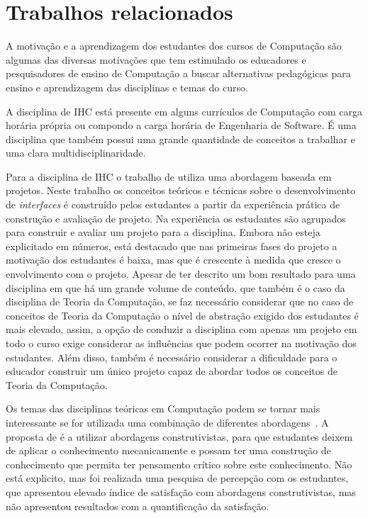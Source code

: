 \section{Trabalhos relacionados}
\label{sec-revisao-relacionados}
A motivação e a aprendizagem dos estudantes dos cursos
de Computação são algumas das diversas motivações que tem
estimulado os educadores e pesquisadores de ensino de Computação
a buscar alternativas pedagógicas para ensino e aprendizagem
das disciplinas e temas do curso.



A disciplina de \ac{IHC} está presente em
alguns currículos de Computação com carga horária
própria ou compondo a carga horária de Engenharia de Software.
É uma disciplina que também possui uma grande quantidade de conceitos
a trabalhar e uma clara multidisciplinaridade.

Para a disciplina de \ac{IHC} o trabalho de \cite{pelissoni2003proposta}
utiliza uma abordagem baseada em projetos.
Neste trabalho os conceitos teóricos e técnicas
sobre o desenvolvimento de \textit{interfaces} é construído
pelos estudantes a partir da experiência prática
de construção e avaliação de projeto.
Na experiência os estudantes são agrupados para construir e
avaliar um projeto para a disciplina.
Embora não esteja explicitado em números, está destacado que nas
primeiras fases do projeto a motivação dos estudantes é baixa,
mas que é crescente à medida que cresce o envolvimento com
o projeto.
Apesar de ter descrito um bom resultado para
uma disciplina em que há um grande volume de conteúdo,
que também é o caso da disciplina de Teoria da Computação,
se faz necessário considerar que no caso de conceitos de
Teoria da Computação o nível de abstração exigido dos estudantes
é mais elevado, assim, a opção de conduzir a disciplina com apenas
um projeto em todo o curso exige considerar as influências
que podem ocorrer na motivação dos estudantes.
Além disso, também é necessário considerar a dificuldade para o
educador construir um único projeto capaz de abordar todos os
conceitos de Teoria da Computação.

Os temas das disciplinas teóricas em Computação podem
se tornar mais interessante se for utilizada uma combinação
de diferentes abordagens~\cite{chesnevar2004didactic}.
A proposta de \cite{chesnevar2004didactic} é a utilizar
abordagens construtivistas, para que estudantes deixem
de aplicar o conhecimento mecanicamente e possam ter
uma construção de conhecimento que permita ter pensamento
crítico sobre este conhecimento.
Não está explicito, mas foi realizada uma pesquisa
de percepção com os estudantes, que apresentou elevado índice
de satisfação com abordagens construtivistas, mas não
apresentou resultados com a quantificação da satisfação.

